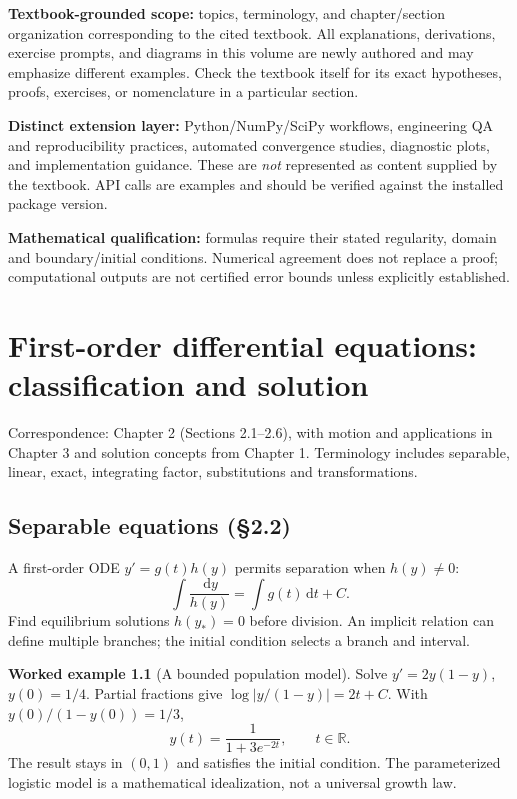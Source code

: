 \documentclass[11pt,letterpaper,oneside]{report}
\theoremstyle{definition}\newtheorem{definition}[theorem]{Definition}
\newtheorem{example}[theorem]{Worked example}
\theoremstyle{remark}\newtheorem{remark}[theorem]{Remark}
\newcommand{\dd}{\,\mathrm{d}}
\newcommand{\R}{\mathbb{R}}
\begin{document}
\begin{bookground}
\textbf{Textbook-grounded scope:} topics, terminology, and chapter/section organization corresponding to the cited textbook. All explanations, derivations, exercise prompts, and diagrams in this volume are newly authored and may emphasize different examples. Check the textbook itself for its exact hypotheses, proofs, exercises, or nomenclature in a particular section.
\end{bookground}
\begin{modern}
\textbf{Distinct extension layer:} Python/NumPy/SciPy workflows, engineering QA and reproducibility practices, automated convergence studies, diagnostic plots, and implementation guidance. These are \emph{not} represented as content supplied by the textbook. API calls are examples and should be verified against the installed package version.
\end{modern}
\begin{caution}
\textbf{Mathematical qualification:} formulas require their stated regularity, domain and boundary/initial conditions. Numerical agreement does not replace a proof; computational outputs are not certified error bounds unless explicitly established.
\end{caution}
\tableofcontents\clearpage{}
\chapter{First-order differential equations: classification and solution}
\begin{bookground}Correspondence: Chapter 2 (Sections 2.1--2.6), with motion and applications in Chapter 3 and solution concepts from Chapter 1. Terminology includes separable, linear, exact, integrating factor, substitutions and transformations.\end{bookground}
\section{Separable equations (\S2.2)}
A first-order ODE $y'=g(t)h(y)$ permits separation when $h(y)\ne0$:
\[\int\frac{\dd y}{h(y)}=\int g(t)\dd t+C.\]
Find equilibrium solutions $h(y_*)=0$ before division. An implicit relation can define multiple branches; the initial condition selects a branch and interval.
\begin{example}[A bounded population model]
Solve $y'=2y(1-y)$, $y(0)=1/4$. Partial fractions give $\log|y/(1-y)|=2t+C$. With $y(0)/(1-y(0))=1/3$,
\[y(t)=\frac{1}{1+3e^{-2t}},\qquad t\in\R.\]
The result stays in $(0,1)$ and satisfies the initial condition. The parameterized logistic model is a mathematical idealization, not a universal growth law.
\end{example}
\end{document}
